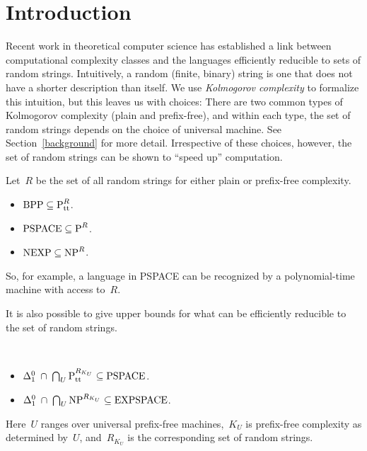 \documentclass{LMCS}
\newcommand{\0}{\mathbf{0}}
\newcommand{\<}{\langle}
\renewcommand{\>}{\rangle}
\begin{document}
\maketitle\vfill



\section{Introduction}
\label{sec_intro}

Recent work in theoretical computer science has established a link between
computational complexity classes and the languages efficiently reducible to
sets of random strings. Intuitively, a random (finite, binary) string is one
that does not have a shorter description than itself. We use \emph{Kolmogorov
complexity} to formalize this intuition, but this leaves us with choices:
There are two common types of Kolmogorov complexity (plain and prefix-free),
and within each type, the set of random strings depends on the choice of
universal machine. See Section~\ref{background} for more detail. Irrespective
of these choices, however, the set of random strings can be shown to ``speed
up'' computation.

\begin{thm}\label{thm:low} Let~$R$ be the set of all
random strings for either plain or prefix-free complexity.
\begin{itemize}
	\item $\textup{BPP}\subseteq \textup{P}^R_\text{tt}$.
	\item $\textup{PSPACE}\subseteq \textup{P}^R$.
	\item $\textup{NEXP}\subseteq \textup{NP}^R$.
\end{itemize}
\end{thm}

\noindent So, for example, a language in PSPACE can be recognized by a
polynomial-time machine with access to~$R$.

It is also possible to give upper bounds for what can be efficiently
reducible to the set of random strings.

\begin{thm}\label{thm:AFG}\
\begin{itemize}
\item $\Delta^0_1\;\cap\;\bigcap_{U}\textup{P}_\text{tt}^{R_{K_U}}
    \subseteq\textup{PSPACE}$.
\item $\Delta^0_1\;\cap\;\bigcap_{U}\textup{NP}^{R_{K_U}}
    \subseteq\textup{EXPSPACE}$.
\end{itemize}
Here~$U$ ranges over universal prefix-free machines,~$K_U$ is prefix-free
complexity as determined by~$U$, and~$R_{K_U}$ is the corresponding set of
random strings.
\end{thm}
\end{document}
